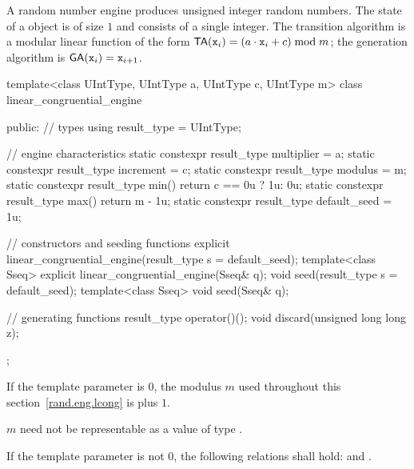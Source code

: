 \pnum
A  random number engine
produces unsigned integer random numbers.
The state%
of a  object 
is of size $1$
and consists of a single integer.
The transition algorithm%
%
is a modular linear function of the form
$\mathsf{TA}(\texttt{x}_{i}) = (a \cdot \texttt{x}_{i} + c) \bmod m$;
the generation algorithm%
%
is $ \mathsf{GA}(\texttt{x}_{i}) = \texttt{x}_{i+1} $.

%
\begin{codeblock}
template<class UIntType, UIntType a, UIntType c, UIntType m>
  class linear_congruential_engine {
  public:
    // types
    using result_type = UIntType;

    // engine characteristics
    static constexpr result_type multiplier = a;
    static constexpr result_type increment = c;
    static constexpr result_type modulus = m;
    static constexpr result_type min() { return c == 0u ? 1u: 0u; }
    static constexpr result_type max() { return m - 1u; }
    static constexpr result_type default_seed = 1u;

    // constructors and seeding functions
    explicit linear_congruential_engine(result_type s = default_seed);
    template<class Sseq> explicit linear_congruential_engine(Sseq& q);
    void seed(result_type s = default_seed);
    template<class Sseq> void seed(Sseq& q);

    // generating functions
    result_type operator()();
    void discard(unsigned long long z);
  };
\end{codeblock}

\pnum
If the template parameter
 is $0$,
the modulus $m$
used throughout this section~\ref{rand.eng.lcong}
is  plus $1$.
\begin{note}
 $m$ need not be representable
 as a value of type .
\end{note}

\pnum
If the template parameter
 is not $0$,
the following relations shall hold:
and
  .

